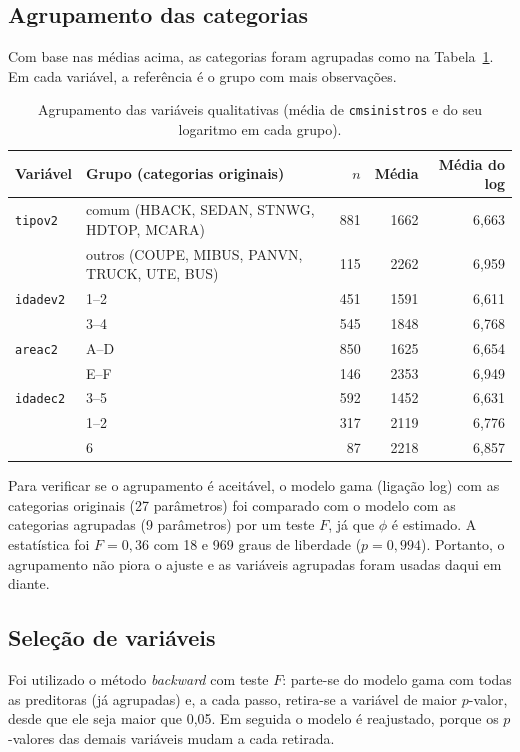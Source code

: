 \subsection*{Agrupamento das categorias}

Com base nas médias acima, as categorias foram agrupadas como na Tabela~\ref{tab:ex1grp}. Em cada variável, a referência é o grupo com mais observações.

\begin{table}[H]
\centering\small
\caption{Agrupamento das variáveis qualitativas (média de \texttt{cmsinistros} e do seu logaritmo em cada grupo).}\label{tab:ex1grp}
\begin{tabular}{llrrr}
\toprule
Variável & Grupo (categorias originais) & $n$ & Média & Média do log \\
\midrule
\texttt{tipov2} & comum (HBACK, SEDAN, STNWG, HDTOP, MCARA) & 881 & 1662 & 6,663 \\
 & outros (COUPE, MIBUS, PANVN, TRUCK, UTE, BUS) & 115 & 2262 & 6,959 \\
\texttt{idadev2} & 1--2 & 451 & 1591 & 6,611 \\
 & 3--4 & 545 & 1848 & 6,768 \\
\texttt{areac2} & A--D & 850 & 1625 & 6,654 \\
 & E--F & 146 & 2353 & 6,949 \\
\texttt{idadec2} & 3--5 & 592 & 1452 & 6,631 \\
 & 1--2 & 317 & 2119 & 6,776 \\
 & 6 & 87 & 2218 & 6,857 \\
\bottomrule
\end{tabular}
\end{table}

Para verificar se o agrupamento é aceitável, o modelo gama (ligação log) com as categorias originais (27 parâmetros) foi comparado com o modelo com as categorias agrupadas (9 parâmetros) por um teste $F$, já que $\phi$ é estimado. A estatística foi $F=0{,}36$ com 18 e 969 graus de liberdade ($p=0{,}994$). Portanto, o agrupamento não piora o ajuste e as variáveis agrupadas foram usadas daqui em diante.

\subsection*{Seleção de variáveis}

Foi utilizado o método \emph{backward} com teste $F$: parte-se do modelo gama com todas as preditoras (já agrupadas) e, a cada passo, retira-se a variável de maior $p$-valor, desde que ele seja maior que 0,05. Em seguida o modelo é reajustado, porque os $p$-valores das demais variáveis mudam a cada retirada.

